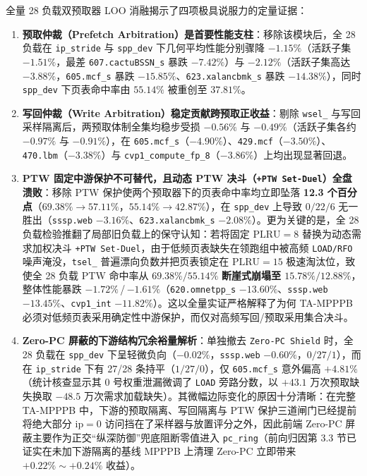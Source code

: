 \documentclass[10.5pt,compsoc,UTF8]{CjC}
\begin{document}
全量 28 负载双预取器 LOO 消融揭示了四项极具说服力的定量证据：
\begin{enumerate}
  \item \textbf{预取仲裁（Prefetch Arbitration）是首要性能支柱}：移除该模块后，全 28 负载在 \texttt{ip\_stride} 与 \texttt{spp\_dev} 下几何平均性能分别骤降 \mbox{\textbf{$-1.15\%$}}（活跃子集 $-1.51\%$，最差 \texttt{607.cactuBSSN\_s} 暴跌 $-7.42\%$）与 \mbox{\textbf{$-2.12\%$}}（活跃子集高达 \mbox{\textbf{$-3.88\%$}}，\texttt{605.mcf\_s} 暴跌 \mbox{\textbf{$-15.85\%$}}、\texttt{623.xalancbmk\_s} 暴跌 \mbox{\textbf{$-14.38\%$}}），同时 \texttt{spp\_dev} 下页表命中率由 $55.14\%$ 被重创至 $37.81\%$。
  \item \textbf{写回仲裁（Write Arbitration）稳定贡献跨预取正收益}：剔除 \texttt{wsel\_} 与写回采样隔离后，两预取体制全集均稳步受损 $-0.56\%$ 与 $-0.49\%$（活跃子集各约 $-0.97\%$ 与 $-0.91\%$），在 \texttt{605.mcf\_s}（$-4.90\%$）、\texttt{429.mcf}（$-3.50\%$）、\texttt{470.lbm}（$-3.38\%$）与 \texttt{cvp1\_compute\_fp\_8}（$-3.86\%$）上均出现显著回退。
  \item \textbf{PTW 固定中游保护不可替代，且动态 PTW 决斗（\texttt{+PTW Set-Duel}）全盘溃败}：移除 PTW 保护使两个预取器下的页表命中率均立即坠落 \textbf{12.3 个百分点}（$69.38\%\to 57.11\%$，$55.14\%\to 42.87\%$），在 \texttt{spp\_dev} 上导致 $0/22/6$ 无一胜出（\texttt{sssp.web} $-3.16\%$、\texttt{623.xalancbmk\_s} $-2.08\%$）。更为关键的是，全 28 负载检验推翻了局部旧负载上的保守认知：若将固定 $\mathrm{PLRU}=8$ 替换为动态需求加权决斗 \texttt{+PTW Set-Duel}，由于低频页表缺失在领跑组中被高频 \texttt{LOAD/RFO} 噪声淹没，\texttt{tsel\_} 普遍漂向负数并把页表锁定在 $\mathrm{PLRU}=15$ 极速淘汰位，致使全 28 负载 PTW 命中率从 $69.38\% / 55.14\%$ \textbf{断崖式崩塌至 $15.78\% / 12.88\%$}，整体性能暴跌 \mbox{\textbf{$-1.72\%$}}\,/\,\mbox{\textbf{$-1.61\%$}}（\texttt{620.omnetpp\_s} $-13.60\%$、\texttt{sssp.web} $-13.45\%$、\texttt{cvp1\_int} $-11.82\%$）。这以全量实证严格解释了为何 TA-MPPPB 必须对低频页表采用确定性中游保护，而仅对高频写回/预取采用集合决斗。
  \item \textbf{Zero-PC 屏蔽的下游结构冗余裕量解析}：单独撤去 \texttt{Zero-PC Shield} 时，全 28 负载在 \texttt{spp\_dev} 下呈轻微负向（$-0.02\%$，\texttt{sssp.web} $-0.60\%$，$0/27/1$），而在 \texttt{ip\_stride} 下有 27/28 条持平（$1/27/0$），仅 \texttt{605.mcf\_s} 意外偏高 $+4.81\%$（统计核查显示其 0 号权重泄漏微调了 \texttt{LOAD} 旁路分数，以 $+43.1$ 万次预取缺失换取 $-48.5$ 万次需求加载缺失）。其微幅边际变化的原因十分清晰：在完整 TA-MPPPB 中，下游的预取隔离、写回隔离与 PTW 保护三道闸门已经提前将绝大部分 $\mathrm{ip}=0$ 访问挡在了采样器与放置评分之外，因此前端 Zero-PC 屏蔽主要作为正交“纵深防御”兜底阻断零值进入 \texttt{pc\_ring}（前向归因第 3.3 节已证实在未加下游隔离的基线 MPPPB 上清理 Zero-PC 立即带来 $+0.22\%\sim +0.24\%$ 收益）。
\end{enumerate}
\end{document}
